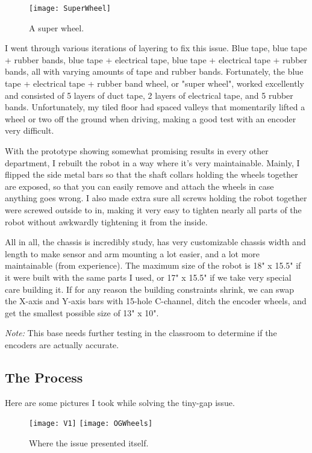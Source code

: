 \begin{figure}[h]
    \centering
    \texttt{[image: SuperWheel]}
    \caption{
        A super wheel.
    }
\end{figure}

I went through various iterations of layering to fix this issue. Blue tape, blue tape + rubber bands, blue tape + electrical tape, blue tape + electrical tape + rubber bands, all with varying amounts of tape and rubber bands. Fortunately, the blue tape + electrical tape + rubber band wheel, or "super wheel", worked excellently and consisted of 5 layers of duct tape, 2 layers of electrical tape, and 5 rubber bands. Unfortunately, my tiled floor had spaced valleys that momentarily lifted a wheel or two off the ground when driving, making a good test with an encoder very difficult.

With the prototype showing somewhat promising results in every other department, I rebuilt the robot in a way where it's very maintainable. Mainly, I flipped the side metal bars so that the shaft collars holding the wheels together are exposed, so that you can easily remove and attach the wheels in case anything goes wrong. I also made extra sure all screws holding the robot together were screwed outside to in, making it very easy to tighten nearly all parts of the robot without awkwardly tightening it from the inside.

All in all, the chassis is incredibly study, has very customizable chassis width and length to make sensor and arm mounting a lot easier, and a lot more maintainable (from experience). The maximum size of the robot is 18" x 15.5" if it were built with the same parts I used, or 17" x 15.5" if we take very special care building it. If for any reason the building constraints shrink, we can swap the X-axis and Y-axis bars with 15-hole C-channel, ditch the encoder wheels, and get the smallest possible size of 13" x 10".

\textit{Note:} This base needs further testing in the classroom to determine if the encoders are actually accurate.

\subsection{The Process}
Here are some pictures I took while solving the tiny-gap issue.

\begin{figure}[h]
    \centering
    \texttt{[image: V1]}
    \texttt{[image: OGWheels]}
    \caption{
        Where the issue presented itself.
    }
\end{figure}

